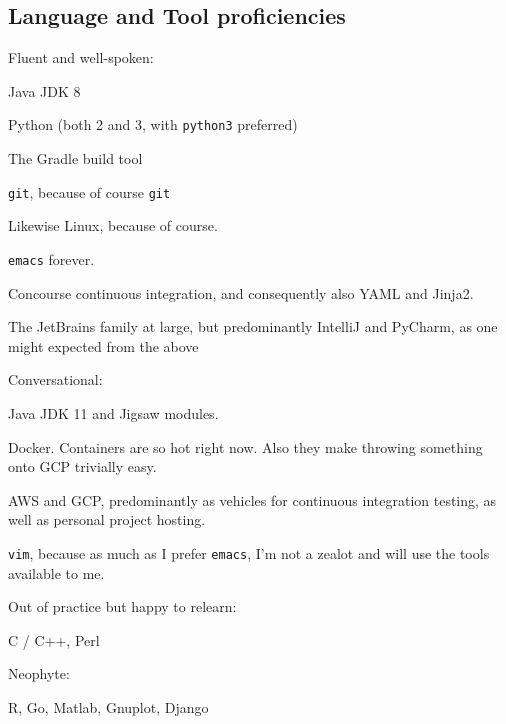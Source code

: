 \documentclass[10pt,letterpaper]{article}
\newcommand\ttt\texttt
\renewenvironment{itemize}{
  \begin{list}{}{
    \setlength{\leftmargin}{1.5em}
    \setlength{\itemsep}{0.25em}
    \setlength{\parskip}{0pt}
    \setlength{\parsep}{0.25em}
  }
}{
  \end{list}
}
\begin{document}
\subsection*{Language and Tool proficiencies}
\begin{itemize}
  \item Fluent and well-spoken:
  \begin{itemize}
    \item Java JDK 8
    \item Python (both 2 and 3, with \ttt{python3} preferred)
    \item The Gradle build tool
    \item \ttt{git}, because of course \ttt{git}
    \item Likewise Linux, because of course.
    \item \ttt{emacs} forever.
    \item Concourse continuous integration, and consequently also YAML and Jinja2.
    \item The JetBrains family at large, but predominantly IntelliJ and PyCharm, as one might expected from the above
  \end{itemize}
  \item Conversational:
  \begin{itemize}
    \item Java JDK 11 and Jigsaw modules.
    \item Docker.  Containers are so hot right now.  Also they make throwing something onto GCP trivially easy.
    \item AWS and GCP, predominantly as vehicles for continuous integration testing, as well as personal project hosting.
    \item \ttt{vim}, because as much as I prefer \ttt{emacs}, I'm not a zealot and will use the tools available to me.
  \end{itemize}
  \item Out of practice but happy to relearn:
  \begin{itemize}
    \item C / C++, Perl
  \end{itemize}
  \item Neophyte:
  \begin{itemize}
    \item R, Go, Matlab, Gnuplot, Django
  \end{itemize}
\end{itemize}
\end{document}
